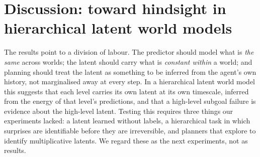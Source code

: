 \documentclass[11pt]{article}
\begin{document}
\section{Discussion: toward hindsight in hierarchical latent world models}
The results point to a division of labour. The predictor should model what is \emph{the same} across worlds; the
latent should carry what is \emph{constant within} a world; and planning should treat the latent as something to be
inferred from the agent's own history, not marginalised away at every step. In a hierarchical latent world model this
suggests that each level carries its own latent at its own timescale, inferred from the energy of that level's
predictions, and that a high-level subgoal failure is evidence about the high-level latent. Testing this requires three
things our experiments lacked: a latent learned without labels, a hierarchical task in which surprises are identifiable
before they are irreversible, and planners that explore to identify multiplicative latents. We regard these as the next
experiments, not as results.




\appendix

\end{document}
